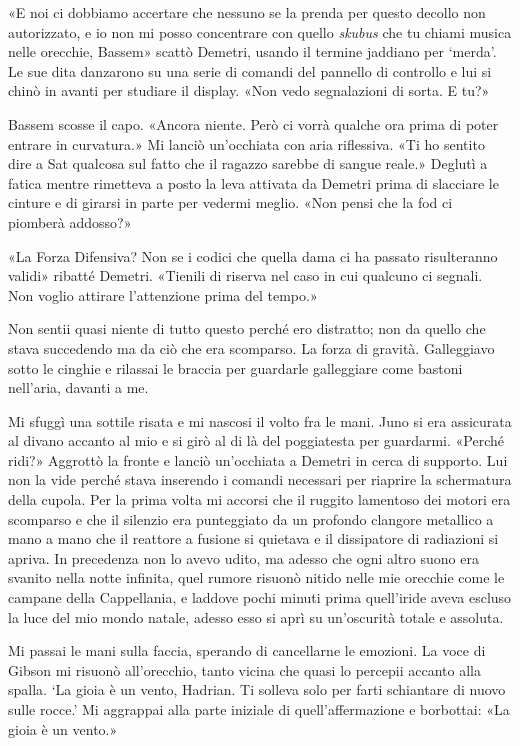 «E noi ci dobbiamo accertare che nessuno se la prenda per questo decollo
non autorizzato, e io non mi posso concentrare con quello \emph{skubus}
che tu chiami musica nelle orecchie, Bassem» scattò Demetri, usando il
termine jaddiano per `merda'. Le sue dita danzarono su una serie di
comandi del pannello di controllo e lui si chinò in avanti per studiare
il display. «Non vedo segnalazioni di sorta. E tu?»

Bassem scosse il capo. «Ancora niente. Però ci vorrà qualche ora prima
di poter entrare in curvatura.» Mi lanciò un'occhiata con aria
riflessiva. «Ti ho sentito dire a Sat qualcosa sul fatto che il ragazzo
sarebbe di sangue reale.» Deglutì a fatica mentre rimetteva a posto la
leva attivata da Demetri prima di slacciare le cinture e di girarsi in
parte per vedermi meglio. «Non pensi che la
\foreignlanguage{italian}{fod} ci piomberà addosso?»

«La Forza Difensiva? Non se i codici che quella dama ci ha passato
risulteranno validi» ribatté Demetri. «Tienili di riserva nel caso in
cui qualcuno ci segnali. Non voglio attirare l'attenzione prima del
tempo.»

Non sentii quasi niente di tutto questo perché ero distratto; non da
quello che stava succedendo ma da ciò che era scomparso. La forza di
gravità. Galleggiavo sotto le cinghie e rilassai le braccia per
guardarle galleggiare come bastoni nell'aria, davanti a me.

Mi sfuggì una sottile risata e mi nascosi il volto fra le mani. Juno si
era assicurata al divano accanto al mio e si girò al di là del
poggiatesta per guardarmi. «Perché ridi?» Aggrottò la fronte e lanciò
un'occhiata a Demetri in cerca di supporto. Lui non la vide perché stava
inserendo i comandi necessari per riaprire la schermatura della cupola.
Per la prima volta mi accorsi che il ruggito lamentoso dei motori era
scomparso e che il silenzio era punteggiato da un profondo clangore
metallico a mano a mano che il reattore a fusione si quietava e il
dissipatore di radiazioni si apriva. In {precedenza} non lo avevo udito,
ma adesso che ogni altro suono era svanito nella notte infinita, quel
rumore risuonò nitido nelle mie orecchie come le campane della
Cappellania, e laddove pochi minuti prima quell'iride aveva escluso la
luce del mio mondo natale, adesso esso si aprì su un'oscurità totale e
assoluta.

Mi passai le mani sulla faccia, sperando di cancellarne le emozioni. La
voce di Gibson mi risuonò all'orecchio, tanto vicina che quasi lo
percepii accanto alla spalla. `La gioia è un vento, Hadrian.
\label{fileintero-22.xhtml__idTextAnchor001}{}Ti solleva
solo per farti schiantare di nuovo sulle rocce.' Mi aggrappai alla parte
iniziale di quell'affermazione e borbottai:
«\label{fileintero-22.xhtml__idTextAnchor002}{}La gioia è
un vento.»

